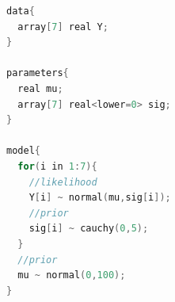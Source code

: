 \begin{lstlisting}[language=C++,label={stan::18_01},caption={7人の科学者コード}]
data{
  array[7] real Y;
}

parameters{
  real mu;
  array[7] real<lower=0> sig;
}

model{
  for(i in 1:7){
    //likelihood
    Y[i] ~ normal(mu,sig[i]);
    //prior
    sig[i] ~ cauchy(0,5);
  }
  //prior
  mu ~ normal(0,100);
}

\end{lstlisting}
